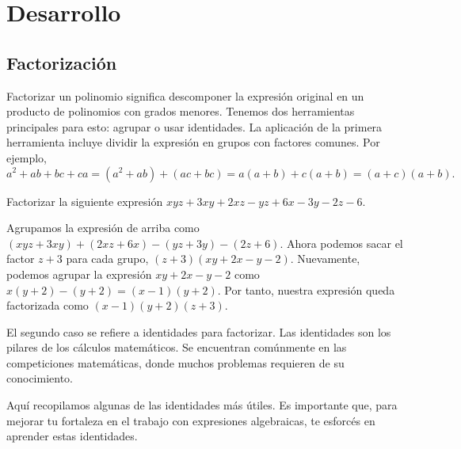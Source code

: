 \section{Desarrollo}

\subsection{Factorización}

Factorizar un polinomio significa descomponer la expresión original en un producto de polinomios con grados menores.
Tenemos dos herramientas principales para esto: agrupar o usar identidades.
La aplicación de la primera herramienta incluye dividir la expresión en grupos con factores comunes.
Por ejemplo,
\[
    a^2 + ab + bc + ca = (a^2 + ab) + (ac + bc) = a(a + b) + c(a + b) = (a + c)(a + b).
\]

\begin{example}
    Factorizar la siguiente expresión $xyz + 3xy + 2xz - yz + 6x - 3y - 2z - 6$.
\end{example}
\begin{solution}
    Agrupamos la expresión de arriba como $(xyz + 3xy) + (2xz + 6x) - (yz + 3y) - (2z + 6)$.
    Ahora podemos sacar el factor $z + 3$ para cada grupo, $(z + 3)(xy + 2x - y - 2)$.
    Nuevamente, podemos agrupar la expresión $xy + 2x - y - 2$ como $x(y + 2) - (y + 2) = (x - 1)(y + 2)$.
    Por tanto, nuestra expresión queda factorizada como $(x - 1)(y + 2)(z + 3)$.
\end{solution}

El segundo caso se refiere a identidades para factorizar.
Las identidades son los pilares de los cálculos matemáticos.
Se encuentran comúnmente en las competiciones matemáticas, donde muchos problemas requieren de su conocimiento.

Aquí recopilamos algunas de las identidades más útiles.
Es importante que, para mejorar tu fortaleza en el trabajo con expresiones algebraicas, te esforcés en aprender estas identidades.

\vspace{2mm}

